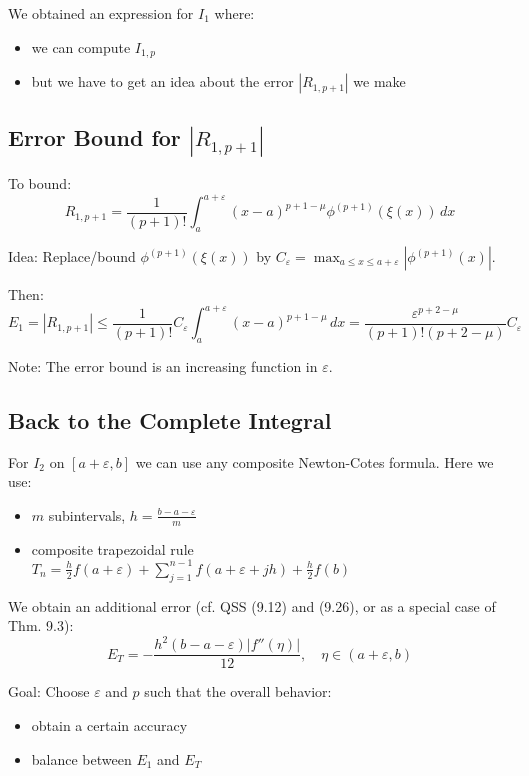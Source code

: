 We obtained an expression for $I_1$ where:
\begin{itemize}
    \item we can compute $I_{1,p}$
    \item but we have to get an idea about the error $|R_{1,p+1}|$ we make
\end{itemize}

\subsection{Error Bound for \texorpdfstring{$|R_{1,p+1}|$}{R1,p+1}}

To bound:
\[R_{1,p+1} = \frac{1}{(p+1)!} \int_a^{a+\varepsilon} (x-a)^{p+1-\mu} \phi^{(p+1)}(\xi(x)) \, dx\]

Idea: Replace/bound $\phi^{(p+1)}(\xi(x))$ by $C_{\varepsilon} = \max_{a \leq x \leq a+\varepsilon} |\phi^{(p+1)}(x)|$.

Then:
\[E_1 = |R_{1,p+1}| \leq \frac{1}{(p+1)!} C_{\varepsilon} \int_a^{a+\varepsilon} (x-a)^{p+1-\mu} \, dx = \frac{\varepsilon^{p+2-\mu}}{(p+1)!(p+2-\mu)} C_{\varepsilon}\]

Note: The error bound is an increasing function in $\varepsilon$.

\subsection{Back to the Complete Integral}

For $I_2$ on $[a+\varepsilon, b]$ we can use any composite Newton-Cotes formula. Here we use:
\begin{itemize}
    \item $m$ subintervals, $h = \frac{b-a-\varepsilon}{m}$
    \item composite trapezoidal rule $T_n = \frac{h}{2} f(a+\varepsilon) + \sum_{j=1}^{n-1} f(a+\varepsilon+jh) + \frac{h}{2} f(b)$
\end{itemize}

We obtain an additional error (cf. QSS (9.12) and (9.26), or as a special case of Thm. 9.3):
\[E_T = -\frac{h^2(b-a-\varepsilon)|f''(\eta)|}{12}, \quad \eta \in (a+\varepsilon, b)\]

Goal: Choose $\varepsilon$ and $p$ such that the overall behavior:
\begin{itemize}
    \item obtain a certain accuracy
    \item balance between $E_1$ and $E_T$
\end{itemize}

